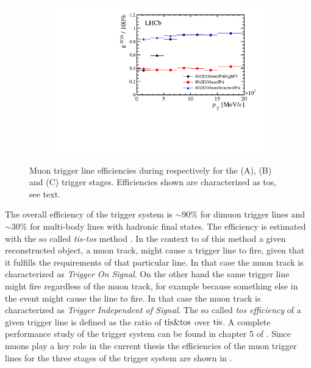 \begin{figure}[t!]
\begin{subfigure}{0.5\textwidth}
    \includegraphics[width=\textwidth,trim=0.45cm 0cm 0.4cm 0cm, clip=true]{Figures/Chapter2/hlt2_muon_eff}
    \caption{}
    \label{det_run_one_hlt2_muon_line_eff}
  \end{subfigure}
  \caption{Muon trigger line efficiencies during \runone respectively for the \lzero (A), \hltone (B) and \hlttwo (C) trigger stages.
           Efficiencies shown are characterized as tos, see text.}
  \label{det_run_one_muon_line_eff}
\end{figure}

The overall efficiency of the \lhcb trigger system is $\sim 90\%$ for dimuon trigger lines and $\sim 30\%$
for multi-body lines with hadronic final states. The efficiency is estimated with the so
called {\it tis-tos} method \cite{Aaij:1493820}. In the context to of this method a given reconstructed object,
\ie a muon track, might cause a trigger line to fire, given that it fulfills the requirements of that particular line.
In that case the muon track is characterized as {\it Trigger On Signal}. On the other hand the same trigger line might
fire regardless of the muon track, for example because something else in the event might cause the line
to fire. In that case the muon track is characterized as {\it Trigger Independent of Signal}.
The so called {\it tos efficiency} of a given trigger line is defined as the ratio of ${\rm tis}\&{\rm tos}$
over ${\rm tis}$. A complete performance study of the trigger system can be found in chapter 5
of \cite{Aaij:2014jba}. Since muons play a key role in the current thesis the efficiencies of the muon
trigger lines for the three stages of the \lhcb trigger system are  shown in .

